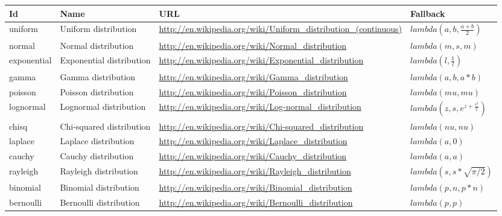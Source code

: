 \documentclass[draftspec]{sbmlpkgspec}
\begin{document}
\begin{blockChanged}
\begin{longtabu} to \linewidth {
    X[2,c]
    X[3,c]
    X[12,c]
    X[4,l]}
\textbf{Id} & \textbf{Name} & \textbf{URL} & \textbf{Fallback} \\ \midrule
uniform & Uniform distribution & \footnotesize{\url{http://en.wikipedia.org/wiki/Uniform_distribution_(continuous)}} &\small{$lambda(a,b,\frac{a+b}{2})$}
\\ \midrule
normal & Normal distribution & \footnotesize{\url{http://en.wikipedia.org/wiki/Normal_distribution}} &\small{$lambda(m,s,m)$}
\\ \midrule
exponential & Exponential distribution & \footnotesize{\url{http://en.wikipedia.org/wiki/Exponential_distribution}} &\small{$lambda(l,\frac{1}{l})$}
\\ \midrule
gamma & Gamma distribution & \footnotesize{\url{http://en.wikipedia.org/wiki/Gamma_distribution}} &\small{$lambda(a,b,a*b)$}
\\ \midrule
poisson & Poisson distribution & \footnotesize{\url{http://en.wikipedia.org/wiki/Poisson_distribution}} &\small{$lambda(mu,mu)$}
\\ \midrule
lognormal & Lognormal distribution & \footnotesize{\url{http://en.wikipedia.org/wiki/Log-normal_distribution}} &\small{$lambda(z,s,e^{z+\frac{s^2}{2}})$}
\\ \midrule
chisq & Chi-squared distribution & \footnotesize{\url{http://en.wikipedia.org/wiki/Chi-squared_distribution}} &\small{$lambda(nu,nu)$}
\\ \midrule
laplace & Laplace distribution & \footnotesize{\url{http://en.wikipedia.org/wiki/Laplace_distribution}} &\small{$lambda(a,0)$}
\\ \midrule
cauchy & Cauchy distribution & \footnotesize{\url{http://en.wikipedia.org/wiki/Cauchy_distribution}} &\small{$lambda(a,a)$}
\\ \midrule
rayleigh & Rayleigh distribution & \footnotesize{\url{http://en.wikipedia.org/wiki/Rayleigh_distribution}} &\small{$lambda(s,s*\sqrt{\pi/2})$}
\\ \midrule
binomial & Binomial distribution & \footnotesize{\url{http://en.wikipedia.org/wiki/Binomial_distribution}} &\small{$lambda(p,n,p*n)$}
\\ \midrule
bernoulli & Bernoulli distribution & \footnotesize{\url{http://en.wikipedia.org/wiki/Bernoulli_distribution}} &\small{$lambda(p,p)$}
\\
\bottomrule
\end{longtabu}

\end{blockChanged}
\end{document}
